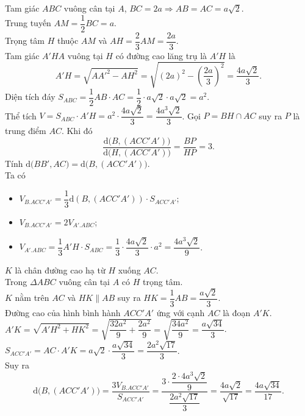 \begin{ex}
{\begin{center}
		\end{center}
		\begin{itemchoice}
			\itemch Tam giác $ABC$ vuông cân tại $A$, $BC=2a \Rightarrow AB=AC=a\sqrt{2}$.\\
			Trung tuyến $AM = \dfrac{1}{2}BC = a$.\\
			Trọng tâm $H$ thuộc $AM$ và $AH = \dfrac{2}{3}AM = \dfrac{2a}{3}$.\\
			Tam giác $A'HA$ vuông tại $H$ có đường cao lăng trụ là $A'H$ là
			\[A'H = \sqrt{AA'^2 - AH^2} = \sqrt{(2a)^2 - \left( \dfrac{2a}{3}\right) ^2} = \dfrac{4a\sqrt{2}}{3}.\]			 
			\itemch Diện tích đáy $S_{ABC} = \dfrac{1}{2}AB \cdot AC = \dfrac{1}{2} \cdot a\sqrt{2} \cdot a\sqrt{2} = a^2$.\\
			Thể tích $V = S_{ABC} \cdot A'H = a^2 \cdot \dfrac{4a\sqrt{2}}{3} = \dfrac{4a^3\sqrt{2}}{3}$.		
			\itemch Gọi $P=BH\cap AC$ suy ra $P$ là trung điểm $AC$. Khi đó			
			\[\dfrac{\mathrm {d}\big(B, (ACC'A')\big)}{\mathrm {d}\big(H, (ACC'A')\big) } =\dfrac{BP}{HP} = 3.\]
			\itemch Tính $\mathrm {d}\big(BB', AC\big) = \mathrm {d}\big(B, (ACC'A')\big)$.\\
			Ta có
			\begin{itemize}
				\item $V_{B.ACC'A'} = \dfrac{1}{3} \mathrm {d}(B, (ACC'A')) \cdot S_{ACC'A'}$;
				\item $V_{B.ACC'A'} =2 V_{A'.ABC}$;
				\item $V_{A'.ABC} = \dfrac{1}{3} A'H \cdot S_{ABC} = \dfrac{1}{3} \cdot \dfrac{4a\sqrt{2}}{3} \cdot a^2 = \dfrac{4a^3\sqrt{2}}{9}$.
			\end{itemize} 
			$K$ là chân đường cao hạ từ $H$ xuống $AC$.\\
			Trong $\Delta ABC$ vuông cân tại $A$ có $H$ trọng tâm.\\
			$K$ nằm trên $AC$ và $HK \parallel AB$ suy ra $HK = \dfrac{1}{3} AB = \dfrac{a\sqrt{2}}{3}$.\\
			Đường cao của hình bình hành $ACC'A'$ ứng với cạnh $AC$ là đoạn $A'K$.\\
			$A'K = \sqrt{A'H^2 + HK^2} = \sqrt{\dfrac{32a^2}{9} + \dfrac{2a^2}{9}} = \sqrt{\dfrac{34a^2}{9}} = \dfrac{a\sqrt{34}}{3}$.\\
			$S_{ACC'A'} = AC \cdot A'K = a\sqrt{2} \cdot \dfrac{a\sqrt{34}}{3} = \dfrac{2a^2\sqrt{17}}{3}$.\\
			Suy ra 			
			\[\mathrm {d}\big(B, (ACC'A')\big) = \dfrac{3 V_{B.ACC'A'}}{S_{ACC'A'}} = \dfrac{3 \cdot \dfrac{2\cdot4a^3\sqrt{2}}{9}}{\dfrac{2a^2\sqrt{17}}{3}} = \dfrac{4a\sqrt{2}}{\sqrt{17}} = \dfrac{4a\sqrt{34}}{17}.\]			
		\end{itemchoice}
	}
\end{ex}
